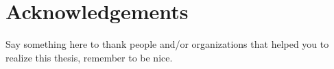 \chapter*{Acknowledgements}
Say something here to thank people and/or organizations that helped you to realize this thesis, remember to be nice.